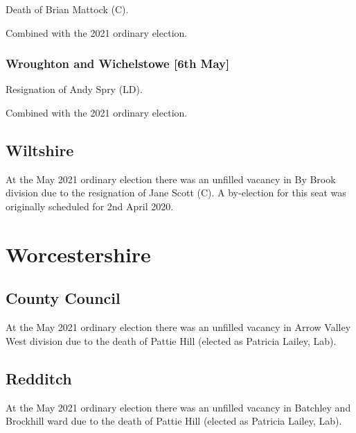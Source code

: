 \documentclass[a4paper,openany]{book}
\begin{document}
\begin{resultsiii}
Death of Brian Mattock (C).

Combined with the 2021 ordinary election.

\subsubsection*{Wroughton and Wichelstowe \hspace*{\fill}\nolinebreak[1]%
	\enspace\hspace*{\fill}
	[6th May]}


Resignation of Andy Spry (LD).

Combined with the 2021 ordinary election.

\subsection*{Wiltshire}

At the May 2021 ordinary election there was an unfilled vacancy in By Brook division due to the resignation of Jane Scott (C).  A by-election for this seat was originally scheduled for 2nd April 2020.

\section{Worcestershire}

\subsection*{County Council}

At the May 2021 ordinary election there was an unfilled vacancy in Arrow Valley West division due to the death of Pattie Hill (elected as Patricia Lailey, Lab).

\subsection*{Redditch}

At the May 2021 ordinary election there was an unfilled vacancy in Batchley and Brockhill ward due to the death of Pattie Hill (elected as Patricia Lailey, Lab).


\end{resultsiii}
\end{document}
